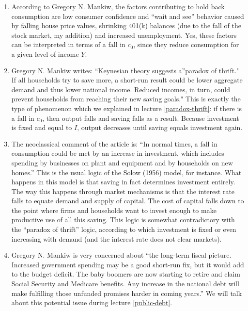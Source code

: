 \documentclass[]{book}
\begin{document}
\begin{enumerate}
\def\labelenumi{\arabic{enumi}.}
\item
  According to Gregory N. Mankiw, the factors contributing to hold back
  consumption are low consumer confidence and ``wait and see'' behavior
  caused by falling house price values, shrinking 401(k) balances (due
  to the fall of the stock market, my addition) and increased
  unemployment. Yes, these factors can be interpreted in terms of a fall
  in \(c_0\), since they reduce consumption for a given level of income
  \(Y\).
\item
  Gregory N. Mankiw writes: ``Keynesian theory suggests a''paradox of
  thrift." If all households try to save more, a short-run result could
  be lower aggregate demand and thus lower national income. Reduced
  incomes, in turn, could prevent households from reaching their new
  saving goals." This is exactly the type of phenomenon which we
  explained in lecture \ref{paradox-thrift}: if there is a fall in
  \(c_0\), then output falls and saving falls as a result. Because
  investment is fixed and equal to \(\bar{I}\), output decreases until
  saving equals investment again.
\item
  The neoclassical comment of the article is: ``In normal times, a fall
  in consumption could be met by an increase in investment, which
  includes spending by businesses on plant and equipment and by
  households on new homes.'' This is the usual logic of the Solow (1956)
  model, for instance. What happens in this model is that saving in fact
  determines investment entirely. The way this happens through market
  mechanisms is that the interest rate falls to equate demand and supply
  of capital. The cost of capital falls down to the point where firms
  and households want to invest enough to make productive use of all
  this saving. This logic is somewhat contradictory with the ``paradox
  of thrift'' logic, according to which investment is fixed or even
  increasing with demand (and the interest rate does not clear markets).
\item
  Gregory N. Mankiw is very concerned about ``the long-term fiscal
  picture. Increased government spending may be a good short-run fix,
  but it would add to the budget deficit. The baby boomers are now
  starting to retire and claim Social Security and Medicare benefits.
  Any increase in the national debt will make fulfilling those unfunded
  promises harder in coming years.'' We will talk about this potential
  issue during lecture \ref{public-debt}.
\end{enumerate}
\end{document}
